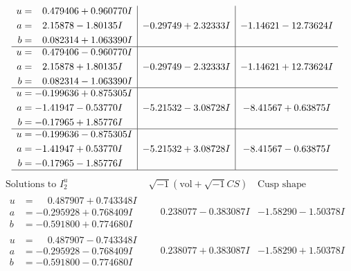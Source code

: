 \documentclass[1p]{elsarticle_modified}
\theoremstyle{definition}
\newcommand{\I}{\sqrt{-1}}
\begin{document}
$$\begin{array}{c|c|c}
\begin{aligned}
u &= \phantom{-}0.479406 + 0.960770 I \\
a &= \phantom{-}2.15878 - 1.80135 I \\
b &= \phantom{-}0.082314 + 1.063390 I\end{aligned}
 & -0.29749 + 2.32333 I & -1.14621 - 12.73624 I \\ \hline\begin{aligned}
u &= \phantom{-}0.479406 - 0.960770 I \\
a &= \phantom{-}2.15878 + 1.80135 I \\
b &= \phantom{-}0.082314 - 1.063390 I\end{aligned}
 & -0.29749 - 2.32333 I & -1.14621 + 12.73624 I \\ \hline\begin{aligned}
u &= -0.199636 + 0.875305 I \\
a &= -1.41947 - 0.53770 I \\
b &= -0.17965 + 1.85776 I\end{aligned}
 & -5.21532 - 3.08728 I & -8.41567 + 0.63875 I \\ \hline\begin{aligned}
u &= -0.199636 - 0.875305 I \\
a &= -1.41947 + 0.53770 I \\
b &= -0.17965 - 1.85776 I\end{aligned}
 & -5.21532 + 3.08728 I & -8.41567 - 0.63875 I\\
 \hline 
 \end{array}$$\newpage$$\begin{array}{c|c|c}  
\text{Solutions to }I^u_{2}& \I (\text{vol} + \sqrt{-1}CS) & \text{Cusp shape}\\
 \hline 
\begin{aligned}
u &= \phantom{-}0.487907 + 0.743348 I \\
a &= -0.295928 + 0.768409 I \\
b &= -0.591800 + 0.774680 I\end{aligned}
 & \phantom{-}0.238077 - 0.383087 I & -1.58290 - 1.50378 I \\ \hline\begin{aligned}
u &= \phantom{-}0.487907 - 0.743348 I \\
a &= -0.295928 - 0.768409 I \\
b &= -0.591800 - 0.774680 I\end{aligned}
 & \phantom{-}0.238077 + 0.383087 I & -1.58290 + 1.50378 I \\ \hline\begin{aligned}

\end{aligned}
\end{array}$$
\end{document}
